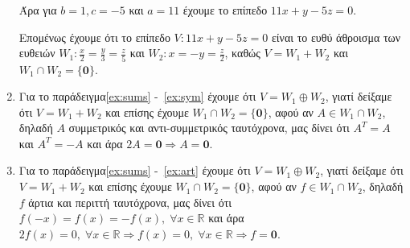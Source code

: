 \begin{examples}
\begin{enumerate}
            Άρα για $ b=1, c=-5 $ και $ a=11 $ έχουμε το επίπεδο $ 11x+y-5z=0 $.

            Επομένως έχουμε ότι το επίπεδο $ V: 11x+y-5z=0 $ είναι το 
            ευθύ άθροισμα των ευθειών $ W_{1}: \frac{x}{2} = \frac{y}{3} = 
            \frac{z}{5}$ και $ W_{2}: x=-y= \frac{z}{2} $, καθώς 
            $ V = W_{1}+W_{2} $ και $ W_{1}\cap W_{2} = \{ \mathbf{0} \} $.

        \item Για το παράδειγμα\ref{ex:sums} -~\ref{ex:sym} έχουμε ότι $ V = W_{1} \oplus W_{2} $, 
            γιατί δείξαμε ότι $ V= W_{1}+W_{2} $ και επίσης έχουμε 
            $ W_{1} \cap W_{2} = \{ \mathbf{0} \} $, 
            αφού αν $A \in W_{1} \cap W_{2}$, δηλαδή $ A $ συμμετρικός και 
            αντι-συμμετρικός ταυτόχρονα, μας δίνει ότι $ A^{T} = A $ και 
            $ A^{T}=-A $ και άρα $ 2A = \mathbf{0} \Rightarrow A= \mathbf{0} $.

        \item Για το παράδειγμα\ref{ex:sums} -~\ref{ex:art} έχουμε ότι $ V = W_{1} \oplus W_{2} $, 
            γιατί δείξαμε ότι $ V= W_{1}+W_{2} $ και επίσης έχουμε 
            $ W_{1} \cap W_{2} = \{ \mathbf{0} \} $, 
            αφού αν $f \in W_{1} \cap W_{2}$, δηλαδή $ f $ άρτια και περιττή 
            ταυτόχρονα, μας δίνει ότι $ f(-x)=f(x)=-f(x), \; \forall x \in 
            \mathbb{R} $ και άρα $ 2f(x) = 0, \; \forall x \in 
            \mathbb{R} \Rightarrow f(x)=0, \; \forall x \in \mathbb{R} 
            \Rightarrow f = \mathbf{0} $.
    \end{enumerate}
\end{examples}



